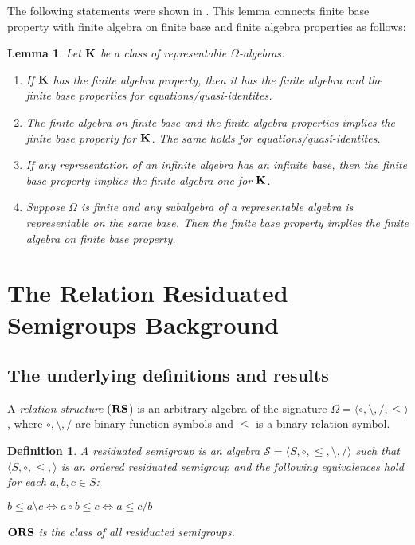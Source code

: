 \documentclass[a4paper]{article}
\theoremstyle{defin}
\newtheorem{defin}{Definition}
\theoremstyle{theorem}
\theoremstyle{prop}
\theoremstyle{lemma}
\newtheorem{lemma}{Lemma}
\theoremstyle{ex}
\theoremstyle{col}
\begin{document}
The following statements were shown in \cite{andreka1999finite}. This lemma connects finite base property with finite algebra on finite base and finite algebra properties as follows:
\begin{lemma}
  Let ${\bf K}$ be a class of representable $\Omega$-algebras:
  \begin{enumerate}
    \item If ${\bf K}$ has the finite algebra property, then it has the finite algebra and the finite base properties for equations/quasi-identites.
    \item The finite algebra on finite base and the finite algebra properties implies the finite base property for ${\bf K}$. The same holds for equations/quasi-identites.
    \item If any representation of an infinite algebra has an infinite base, then the finite base property implies the finite algebra one for ${\bf K}$.
    \item Suppose $\Omega$ is finite and any subalgebra of a representable algebra is representable on the same base. Then the finite base property implies the finite algebra on finite base property.
  \end{enumerate}
\end{lemma}

\section{The Relation Residuated Semigroups Background}

\subsection{The underlying definitions and results}

 A \emph{relation structure} (${\bf RS}$) is an arbitrary algebra of the signature $\Omega = \langle \circ, \setminus, /, \leq \rangle$, where $\circ, \setminus, /$ are binary function symbols and $\leq$ is a binary relation symbol.

\begin{defin}
  A residuated semigroup is an algebra $\mathcal{S} = \langle S, \circ, \leq, \setminus, / \rangle$ such that $\langle S, \circ, \leq, \rangle$ is an ordered residuated semigroup and the following equivalences hold for each $a, b, c \in S$:

  \begin{center}
    $b \leq a \setminus c \Leftrightarrow a \circ b \leq c \Leftrightarrow a \leq c / b$
  \end{center}
  ${\bf ORS}$ is the class of all residuated semigroups.
\end{defin}
\end{document}
